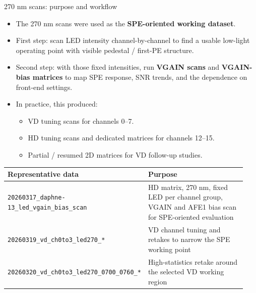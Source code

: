 \documentclass[aspectratio=169]{beamer}
\begin{document}
\begin{frame}{270 nm scans: purpose and workflow}
\footnotesize
\begin{itemize}
  \item The 270 nm scans were used as the \textbf{SPE-oriented working dataset}.
  \item First step: scan LED intensity channel-by-channel to find a usable low-light operating point with visible pedestal / first-PE structure.
  \item Second step: with those fixed intensities, run \textbf{VGAIN scans} and \textbf{VGAIN-bias matrices} to map SPE response, SNR trends, and the dependence on front-end settings.
  \item In practice, this produced:
  \begin{itemize}
    \item VD tuning scans for channels 0--7.
    \item HD tuning scans and dedicated matrices for channels 12--15.
    \item Partial / resumed 2D matrices for VD follow-up studies.
  \end{itemize}
\end{itemize}

\vspace{1mm}
\scriptsize
\begin{tabular}{>{\raggedright\arraybackslash}p{0.33\linewidth} >{\raggedright\arraybackslash}p{0.61\linewidth}}
\toprule
\textbf{Representative data} & \textbf{Purpose} \\
\midrule
\texttt{20260317\_daphne-13\_led\_vgain\_bias\_scan} & HD matrix, 270 nm, fixed LED per channel group, VGAIN and AFE1 bias scan for SPE-oriented evaluation \\
\texttt{20260319\_vd\_ch0to3\_led270\_*} & VD channel tuning and retakes to narrow the SPE working point \\
\texttt{20260320\_vd\_ch0to3\_led270\_0700\_0760\_*} & High-statistics retake around the selected VD working region \\
\bottomrule
\end{tabular}
\end{frame}
\end{document}
